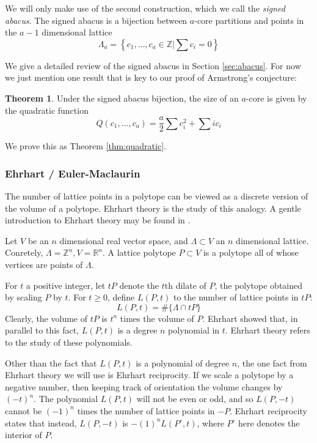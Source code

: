 \documentclass{amsart}[12pt]
\theoremstyle{definition}
\newtheorem{theorem}[dummy]{Theorem}
\newcommand{\Z}{\mathbb{Z}}
\newcommand{\R}{\mathbb{R}}
\begin{document}
We will only make use of the second construction, which we call the \emph{signed abacus}.  The signed abacus is a bijection between $a$-core partitions and points in the $a-1$ dimensional lattice 
$$\Lambda_a=\left\{c_1,\dots,c_a\in\Z\Big |\sum c_i=0\right\}$$

We give a detailed review of the signed abacus in Section \ref{sec:abacus}.  For now we just mention one result that is key to our proof of Armstrong's conjecture: 
\begin{theorem}
Under the signed abacus bijection, the size of an $a$-core is given by the quadratic function 
$$Q(c_1,\dots, c_a)=\frac{a}{2}\sum c_i^2+\sum ic_i$$
\end{theorem}
We prove this as Theorem \ref{thm:quadratic}.



\subsubsection{Ehrhart / Euler-Maclaurin}
The number of lattice points in a polytope can be viewed as a discrete version of the volume of a polytope.  Ehrhart theory is the study of this analogy.  A gentle introduction to Ehrhart theory may be found in \cite{BR}.

Let $V$ be an $n$ dimensional real vector space, and $\Lambda\subset V$ an $n$ dimensional lattice.  Conretely, $\Lambda=\Z^n, V=\R^n$.  A lattice polytope $P\subset V$ is a polytope all of whose vertices are points of $\Lambda$.  

For $t$ a positive integer, let $tP$ denote the $t$th dilate of $P$, the polytope obtained by scaling $P$ by $t$.  For $t\geq 0$, define $L(P,t)$ to the number of lattice points in $tP$: 
$$L(P,t)=\#\{\Lambda\cap tP\}$$
Clearly, the volume of $tP$ is $t^n$ times the volume of $P$.  Ehrhart showed that, in parallel to this fact, $L(P,t)$ is a degree $n$ polynomial in $t$.  Ehrhart theory refers to the study of these polynomials.

Other than the fact that $L(P,t)$ is a polynomial of degree $n$, the one fact from Ehrhart theory we will use is Ehrhart reciprocity.  If we scale a polytope by a negative number, then keeping track of orientation the volume changes by $(-t)^n$.  The polynomial $L(P,t)$ will not be even or odd, and so $L(P,-t)$ cannot be $(-1)^n$ times the number of lattice points in $-P$.  Ehrhart reciprocity states that instead, $L(P,-t)$ is $-(1)^nL(P^\circ, t)$, where $P^\circ$ here denotes the interior of $P$.
\end{document}

